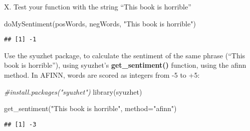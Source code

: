 \documentclass[
]{article}
\newenvironment{Shaded}{\begin{snugshade}}{\end{snugshade}}
\newcommand{\AttributeTok}[1]{\textcolor[rgb]{0.77,0.63,0.00}{#1}}
\newcommand{\CommentTok}[1]{\textcolor[rgb]{0.56,0.35,0.01}{\textit{#1}}}
\newcommand{\FunctionTok}[1]{\textcolor[rgb]{0.00,0.00,0.00}{#1}}
\newcommand{\NormalTok}[1]{#1}
\newcommand{\StringTok}[1]{\textcolor[rgb]{0.31,0.60,0.02}{#1}}
\begin{document}
X. Test your function with the string ``This book is horrible''

\begin{Shaded}
\begin{Highlighting}[]
\FunctionTok{doMySentiment}\NormalTok{(posWords, negWords, }\StringTok{"This book is horrible"}\NormalTok{)}
\end{Highlighting}
\end{Shaded}

\begin{verbatim}
## [1] -1
\end{verbatim}

Use the syuzhet package, to calculate the sentiment of the same phrase
(``This book is horrible''), using syuzhet's \textbf{get\_sentiment()}
function, using the afinn method. In AFINN, words are scored as integers
from -5 to +5:

\begin{Shaded}
\begin{Highlighting}[]
\CommentTok{\#install.packages("syuzhet")}
\FunctionTok{library}\NormalTok{(syuzhet)}

\FunctionTok{get\_sentiment}\NormalTok{(}\StringTok{"This book is horrible"}\NormalTok{, }\AttributeTok{method=}\StringTok{"afinn"}\NormalTok{)}
\end{Highlighting}
\end{Shaded}

\begin{verbatim}
## [1] -3
\end{verbatim}
\end{document}
